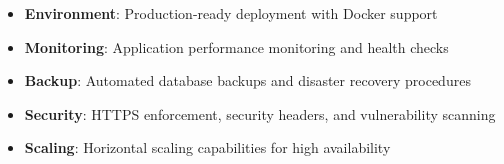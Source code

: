 \documentclass[12pt,a4paper]{article}
\begin{document}
\begin{itemize}
    \item \textbf{Environment}: Production-ready deployment with Docker support
    \item \textbf{Monitoring}: Application performance monitoring and health checks
    \item \textbf{Backup}: Automated database backups and disaster recovery procedures
    \item \textbf{Security}: HTTPS enforcement, security headers, and vulnerability scanning
    \item \textbf{Scaling}: Horizontal scaling capabilities for high availability
\end{itemize}
\end{document}
